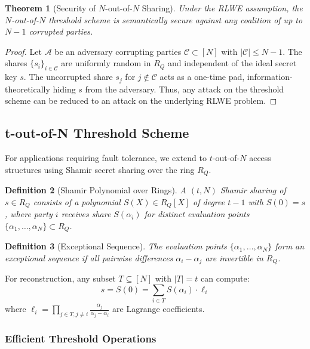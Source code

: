 \documentclass[11pt,a4paper]{article}
\newtheorem{theorem}{Theorem}[section]
\newtheorem{definition}[theorem]{Definition}
\begin{document}
\begin{theorem}[Security of $N$-out-of-$N$ Sharing]
Under the RLWE assumption, the $N$-out-of-$N$ threshold scheme is semantically secure against any coalition of up to $N-1$ corrupted parties.
\end{theorem}

\begin{proof}
Let $\mathcal{A}$ be an adversary corrupting parties $\mathcal{C} \subset [N]$ with $|\mathcal{C}| \leq N-1$. The shares $\{s_i\}_{i \in \mathcal{C}}$ are uniformly random in $R_Q$ and independent of the ideal secret key $s$. The uncorrupted share $s_j$ for $j \notin \mathcal{C}$ acts as a one-time pad, information-theoretically hiding $s$ from the adversary. Thus, any attack on the threshold scheme can be reduced to an attack on the underlying RLWE problem.
\end{proof}

\subsection{t-out-of-N Threshold Scheme}

For applications requiring fault tolerance, we extend to $t$-out-of-$N$ access structures using Shamir secret sharing over the ring $R_Q$.

\begin{definition}[Shamir Polynomial over Rings]
A $(t, N)$ Shamir sharing of $s \in R_Q$ consists of a polynomial $S(X) \in R_Q[X]$ of degree $t-1$ with $S(0) = s$, where party $i$ receives share $S(\alpha_i)$ for distinct evaluation points $\{\alpha_1, \ldots, \alpha_N\} \subset R_Q$.
\end{definition}

\begin{definition}[Exceptional Sequence]
The evaluation points $\{\alpha_1, \ldots, \alpha_N\}$ form an exceptional sequence if all pairwise differences $\alpha_i - \alpha_j$ are invertible in $R_Q$.
\end{definition}

For reconstruction, any subset $T \subseteq [N]$ with $|T| = t$ can compute:
\begin{equation}
s = S(0) = \sum_{i \in T} S(\alpha_i) \cdot \ell_i
\end{equation}
where $\ell_i = \prod_{j \in T, j \neq i} \frac{\alpha_j}{\alpha_j - \alpha_i}$ are Lagrange coefficients.

\subsubsection{Efficient Threshold Operations}
\end{document}
